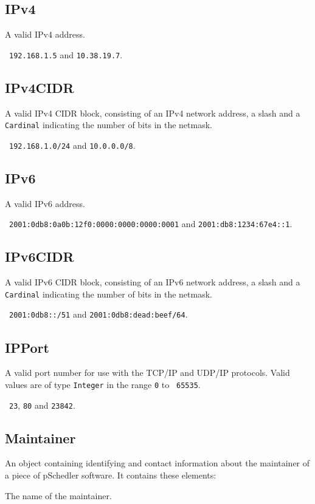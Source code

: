 \documentclass[10pt]{article}
\begin{document}
\subsection{IPv4}
A valid IPv4 address.

\example\ {\tt 192.168.1.5} and {\tt 10.38.19.7}.


\subsection{IPv4CIDR}
A valid IPv4 CIDR block, consisting of an IPv4 network address, a
slash and a {\tt Cardinal} indicating the number of bits in the
netmask.

\example\ {\tt 192.168.1.0/24} and {\tt 10.0.0.0/8}.


\subsection{IPv6}
A valid IPv6 address.

\example\ {\tt  2001:0db8:0a0b:12f0:0000:0000:0000:0001} and {\tt 2001:db8:1234:67e4::1}.


\subsection{IPv6CIDR}
A valid IPv6 CIDR block, consisting of an IPv6 network address, a
slash and a {\tt Cardinal} indicating the number of bits in the
netmask.

\example\ {\tt 2001:0db8::/51} and {\tt 2001:0db8:dead:beef/64}.



\subsection{IPPort}
A valid port number for use with the TCP/IP and UDP/IP protocols.
Valid values are of type {\tt Integer} in the range {\tt 0} to {\tt
  65535}.

\example\ {\tt 23}, {\tt 80} and {\tt 23842}.


\subsection{Maintainer}

An object containing identifying and contact information about the
maintainer of a piece of pSchedler software.  It contains these
elements:

 The name of the maintainer.
\end{document}
